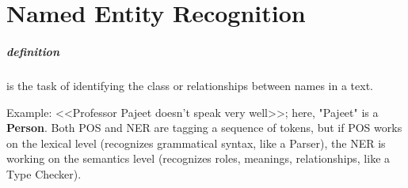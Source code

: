 \chapter{Named Entity Recognition}

\paragraph{definition} is the task of identifying the class or relationships between names in a text.

Example: <<Professor Pajeet doesn't speak very well>>; here, "Pajeet" is a \textbf{Person}.
Both POS and NER are tagging a sequence of tokens, but if POS works on the lexical level (recognizes grammatical syntax, like a Parser), the NER is working on the semantics level (recognizes roles, meanings, relationships, like a Type Checker).
